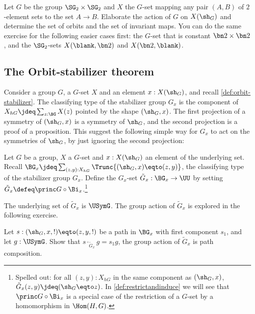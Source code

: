 \begin{xca}\label{xca:Gset-A->B}
Let $G$ be the group $\SG_2\times\SG_2$ and $X$ the $G$-set mapping
any pair $(A,B)$ of $2$-element sets to the set $A\to B$.
Elaborate the action of $G$ on $X(\sh_G)$ and determine the
set of orbits and the set of invariant maps. You can
do the same exercise for the following easier cases first:
the $G$-set that is constant $\bn2\times\bn2$, and
the $\SG_2$-sets $X(\blank,\bn2)$ and $X(\bn2,\blank)$.
\end{xca}

\subsection{The Orbit-stabilizer theorem}

Consider a group $G$, a $G$-set $X$ and an element $x:X(\sh_G)$,
and recall \cref{def:orbit-stabilizer}.
The classifying type of the stabilizer group $G_x$
is the component of $X_{hG}\jdeq\sum_{z:\BG} X(z)$ 
pointed by the shape $(\sh_G,x)$.
The first projection of a symmetry of $(\sh_G,x)$ is a symmetry of 
$\sh_G$, and the second projection is a proof of a proposition.
This suggest the following simple way for $G_x$ to act on the
symmetries of $\sh_G$, by just ignoring the second projection:


\begin{definition}\label{def:Gx-action-on-G}
Let $G$ be a group, $X$ a $G$-set and $x:X(\sh_G)$ an element of 
the underlying set. Recall 
$\BG_x \jdeq \sum_{(z,y):X_{hG}}\Trunc{(\sh_G,x)\eqto(z,y)}$,
the classifying type of the stabilizer group $G_x$. 
Define the $G_x$-set $\tilde G_x : \BG_x \to \UU$ by setting
$\tilde G_x \defeq \princ G \circ \Bi_x$.\footnote{%
Spelled out:
for all $(z,y):X_{hG}$ in the same component as $(\sh_G,x)$, 
$\tilde G_x(z,y)\jdeq(\sh_G\eqto z)$.
In \cref{def:restrictandinduce} we will see that $\princ G \circ \Bi_x$
is a special case of the restriction of a $G$-set by
a homomorphism in $\Hom(H,G)$.
}
\end{definition} 

The underlying set of $\tilde G_x$ is $\USymG$. The group action of
$\tilde G_x$ is explored in the following exercise.

\begin{xca}\label{xca:Gx-action-on-G}
Let $s:(\sh_G,x,!)\eqto(z,y,!)$ be a path in $\BG_x$ with first component
$s_1$, and let $g:\USymG$. Show that $s\cdot_{\tilde G_x} g = s_1 g$, \ie
the group action of $\tilde G_x$ is path composition. 
\end{xca}

